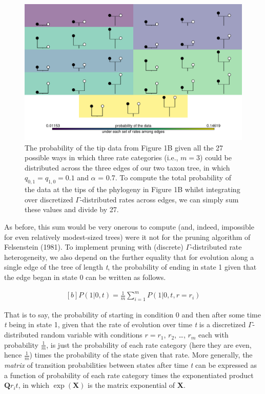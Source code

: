 \documentclass[fleqn,10pt,lineno]{wlpeerj} %
\begin{document}
\begin{figure}
\includegraphics[width=1\linewidth]{Revell-and-Harmon.fitgammaMk.PeerJ_files/figure-latex/Revell-and-Harmon-fig2-1} \caption{The probability of the tip data from Figure 1B given all the 27 possible ways in which three rate categories (i.e., $m = 3$) could be distributed across the three edges of our two taxon tree, in which $q_{0,1} = q_{1,0} = 0.1$ and $\alpha$ = 0.7. To compute the total probability of the data at the tips of the phylogeny in Figure 1B whilst integrating over discretized $\Gamma$-distributed rates across edges, we can simply sum these values and divide by 27.}\label{fig:Revell-and-Harmon-fig2}
\end{figure}

As before, this sum would be very onerous to compute (and, indeed, impossible for even relatively modest-sized trees) were it not for the pruning algorithm of Felsenstein (1981). To implement pruning with (discrete) \(\Gamma\)-distributed rate heterogeneity, we also depend on the further equality that for evolution along a single edge of the tree of length \emph{t}, the probability of ending in state 1 given that the edge began in state 0 can be written as follows.

\begin{equation}
\begin{aligned}[b]
P(1|0,t) = \frac{1}{m} \displaystyle\sum_{i=1}^{m} P(1|0,t,r=r_{i})
\end{aligned}
\end{equation}

That is to say, the probability of starting in condition 0 and then after some time \emph{t} being in state 1, given that the rate of evolution over time \emph{t} is a discretized \(\Gamma\)-distributed random variable with conditions \(r = r_{1}\), \(r_{2}\), \ldots, \(r_{m}\) each with probability \(\frac{1}{m}\), is just the probability of each rate category (here they are even, hence \(\frac{1}{m}\)) times the probability of the state given that rate. More generally, the \emph{matrix} of transition probabilities between states after time \emph{t} can be expressed as a function of probability of each rate category times the exponentiated product \(\mathbf{Q}r_{i}t\), in which \(\exp(\mathbf{X})\) is the matrix exponential of \textbf{X}.
\end{document}
